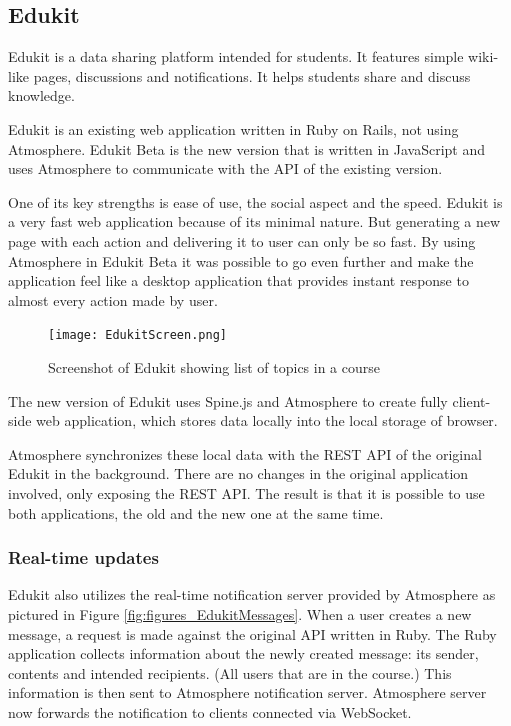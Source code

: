 \subsection{Edukit}
\label{sec:edukit}


Edukit is a data sharing platform intended for students. It features simple wiki-like pages, discussions and notifications. It helps students share and discuss knowledge.

Edukit is an existing web application written in Ruby on Rails, not using Atmosphere. Edukit Beta is the new version that is written in JavaScript and uses Atmosphere to communicate with the API of the existing version.

One of its key strengths is ease of use, the social aspect and the speed. Edukit is a very fast web application because of its minimal nature. But generating a new page with each action and delivering it to user can only be so fast. By using Atmosphere in Edukit Beta it was possible to go even further and make the application feel like a desktop application that provides instant response to almost every action made by user.

\begin{figure}[htbp]
  \centering
    \texttt{[image: EdukitScreen.png]}
  \caption{Screenshot of Edukit showing list of topics in a course}
  \label{fig:figures_EdukitScreen}
\end{figure}

The new version of Edukit uses Spine.js and Atmosphere to create fully client-side web application, which stores data locally into the local storage of browser.

Atmosphere synchronizes these local data with the REST API of the original Edukit in the background. There are no changes in the original application involved, only exposing the REST API. The result is that it is possible to use both applications, the old and the new one at the same time.

\subsubsection{Real-time updates}

Edukit also utilizes the real-time notification server provided by Atmosphere as pictured in Figure \ref{fig:figures_EdukitMessages}. When a user creates a new message, a request is made against the original API written in Ruby.  The Ruby application collects information about the newly created message: its sender, contents and intended recipients. (All users that are in the course.) This information is then sent to Atmosphere notification server.  Atmosphere server now forwards the notification to clients connected via WebSocket. 

